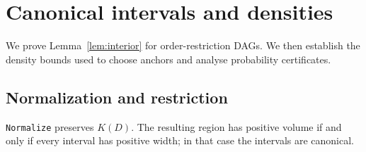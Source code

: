 \section{Canonical intervals and densities}\label{app:geometry}

We prove Lemma~\ref{lem:interior} for order-restriction DAGs. We then establish the
density bounds used to choose anchors and analyse probability certificates.

\subsection{Normalization and restriction}

\begin{lemma}[Normalization]\label{lem:normalization}
\textnormal{\texttt{Normalize}} preserves $K(D)$. The resulting region
has positive volume if and only if every interval has positive width;
in that case the intervals are canonical.
\end{lemma}
